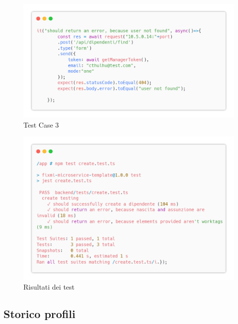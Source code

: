 \documentclass{report}
\begin{document}
\begin{figure}[H]
	\centering\includegraphics[width=1\textwidth]{images/microservizio-dipendenti/tests/find_test_3.png}
	\caption{Test Case 3}
\end{figure}
\begin{figure}[H]
	\centering\includegraphics[width=1\textwidth]{images/microservizio-dipendenti/tests/create_test_results.png}
	\caption{Risultati dei test}
\end{figure}
\subsection*{Storico profili}
\end{document}
